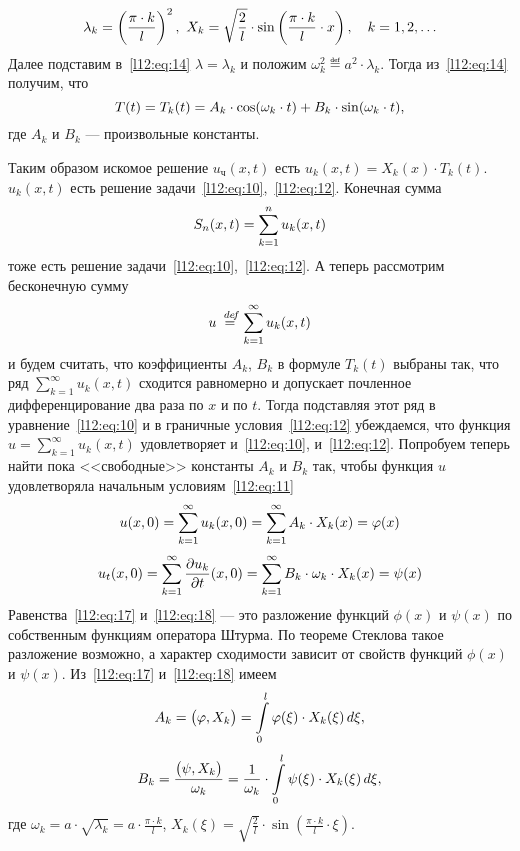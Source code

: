 \begin{equation*}
	\hfill\lambda_k=\left(\frac{\pi\cdot k}{l}\right)^2,\ X_k=\sqrt{\frac{2}{l}}\cdot\sin\left(\frac{\pi\cdot k}{l}\cdot x\right),\quad k=1,2,\ldots\hfill
\end{equation*}
Далее подставим в~\eqref{l12:eq:14} $\lambda=\lambda_k$ и положим $\omega^2_k\eqdef a^2\cdot\lambda_k$. Тогда из~\eqref{l12:eq:14} получим, что 
\begin{equation*}
	\hfill T(t)=T_k(t)=A_k\cdot\cos(\omega_k\cdot t)+B_k\cdot\sin(\omega_k\cdot t),\hfill
\end{equation*}
где $A_k$ и $B_k$ --- произвольные константы. 

Таким образом искомое решение $u_{\text{ч}}(x,t)$ есть $u_k(x,t)=X_k(x)\cdot T_k(t)$. $u_k(x,t)$ есть решение задачи~\eqref{l12:eq:10},~\eqref{l12:eq:12}. Конечная сумма 
\begin{equation*}
	\hfill S_n(x,t)=\sum\limits_{k=1}^n u_k(x,t)\hfill 
\end{equation*}
тоже есть решение задачи~\eqref{l12:eq:10},~\eqref{l12:eq:12}. А теперь рассмотрим бесконечную сумму 
\begin{equation*}
	\hfill u\eqdef\sum\limits_{k=1}^{\infty}u_k(x,t)\hfill
\end{equation*}
и будем считать, что коэффициенты $A_k$, $B_k$ в формуле $T_k(t)$ выбраны так, что ряд $\sum\limits_{k=1}^{\infty}u_k(x,t)$ сходится равномерно и допускает почленное дифференцирование два раза по $x$ и по $t$. Тогда подставляя этот ряд в уравнение~\eqref{l12:eq:10} и в граничные условия~\eqref{l12:eq:12} убеждаемся, что функция $u=\sum\limits_{k=1}^{\infty}u_k(x,t)$ удовлетворяет и~\eqref{l12:eq:10}, и~\eqref{l12:eq:12}. Попробуем теперь найти пока <<свободные>> константы $A_k$ и $B_k$ так, чтобы функция $u$ удовлетворяла начальным условиям~\eqref{l12:eq:11}
\begin{equation}
	\label{l12:eq:17}
	\hfill u(x,0)=\sum\limits_{k=1}^{\infty}u_k(x,0)=\sum\limits_{k=1}^{\infty}A_k\cdot X_k(x)=\phi(x)\hfill
\end{equation}
\begin{equation}
	\label{l12:eq:18}
	\hfill u_t(x,0)=\sum\limits_{k=1}^{\infty}\pder{u_k}{t}(x,0)=\sum\limits_{k=1}^{\infty}B_k\cdot\omega_k\cdot X_k(x)=\psi(x)\hfill
\end{equation}
Равенства~\eqref{l12:eq:17} и~\eqref{l12:eq:18} --- это разложение функций $\phi(x)$ и $\psi(x)$ по собственным функциям оператора Штурма. По теореме Стеклова такое разложение возможно, а характер сходимости зависит от свойств функций $\phi(x)$ и $\psi(x)$. Из~\eqref{l12:eq:17} и~\eqref{l12:eq:18} имеем 
\begin{equation*}
	\hfill A_k=\big(\phi,X_k\big)=\int\limits_0^l\phi(\xi)\cdot X_k(\xi)\,d\xi,\hfill
\end{equation*}
\begin{equation*}
	\hfill B_k=\frac{\big(\psi,X_k\big)}{\omega_k}=\frac{1}{\omega_k}\cdot\int\limits_0^l\psi(\xi)\cdot X_k(\xi)\,d\xi,\hfill
\end{equation*}
где $\displaystyle\omega_k=a\cdot\sqrt{\lambda_k}=a\cdot\frac{\pi\cdot k}{l}$, $\displaystyle  X_k(\xi)=\sqrt{\frac{2}{l}}\cdot\sin\left(\frac{\pi\cdot k}{l}\cdot\xi\right)$.

